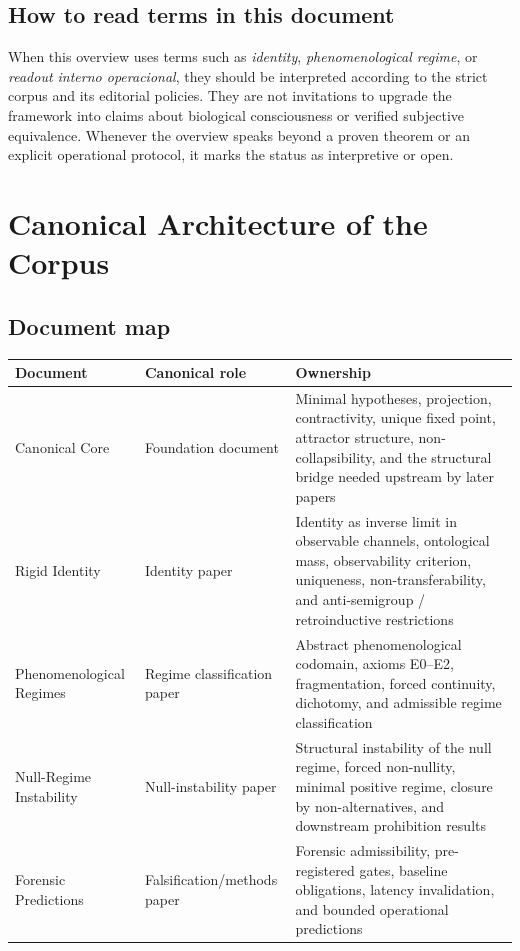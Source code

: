 \documentclass[11pt,a4paper]{article}
\begin{document}
\subsection{How to read terms in this document}

When this overview uses terms such as \emph{identity}, \emph{phenomenological regime}, or \emph{readout interno operacional}, they should be interpreted according to the strict corpus and its editorial policies. They are not invitations to upgrade the framework into claims about biological consciousness or verified subjective equivalence. Whenever the overview speaks beyond a proven theorem or an explicit operational protocol, it marks the status as interpretive or open.

\section{Canonical Architecture of the Corpus}

\subsection{Document map}

\begin{center}
\small
\renewcommand{\arraystretch}{1.14}
\setlength{\tabcolsep}{4pt}
\begin{tabular}{p{} p{} p{}}
\toprule
\textbf{Document} & \textbf{Canonical role} & \textbf{Ownership} \\
\midrule
Canonical Core & Foundation document & Minimal hypotheses, projection, contractivity, unique fixed point, attractor structure, non-collapsibility, and the structural bridge needed upstream by later papers \\
Rigid Identity & Identity paper & Identity as inverse limit in observable channels, ontological mass, observability criterion, uniqueness, non-transferability, and anti-semigroup / retroinductive restrictions \\
Phenomenological Regimes & Regime classification paper & Abstract phenomenological codomain, axioms E0--E2, fragmentation, forced continuity, dichotomy, and admissible regime classification \\
Null-Regime Instability & Null-instability paper & Structural instability of the null regime, forced non-nullity, minimal positive regime, closure by non-alternatives, and downstream prohibition results \\
Forensic Predictions & Falsification/methods paper & Forensic admissibility, pre-registered gates, baseline obligations, latency invalidation, and bounded operational predictions \\
\bottomrule
\end{tabular}
\end{center}
\end{document}
